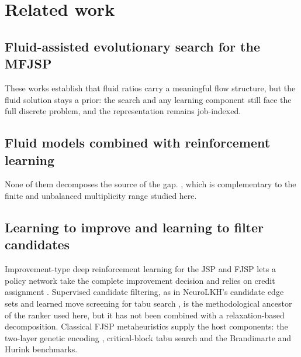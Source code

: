 \section{Related work}\label{sec:related}

\subsection{Fluid-assisted evolutionary search for the MFJSP}\label{sec:related-fluid}
 These works establish that fluid
ratios carry a meaningful flow structure, but the fluid solution stays a prior: the search and any learning component still
face the full discrete problem, and the representation remains job-indexed.

\subsection{Fluid models combined with reinforcement learning}\label{sec:related-rl}
 None of them decomposes the source of the
gap. , which is complementary to the finite and unbalanced multiplicity range
studied here.

\subsection{Learning to improve and learning to filter candidates}\label{sec:related-improve}
Improvement-type deep reinforcement learning for the JSP and FJSP lets a policy network take the complete improvement
decision and relies on credit assignment . Supervised candidate filtering, as in NeuroLKH's candidate edge sets and learned
move screening for tabu search , is the methodological ancestor of the ranker
used here, but it has not been combined with a relaxation-based decomposition. Classical FJSP metaheuristics supply the
host components: the two-layer genetic encoding \cite{pezzella2008genetic}, critical-block tabu search
\cite{mastrolilli2000effective} and the Brandimarte \cite{brandimarte1993routing} and Hurink \cite{hurink1994tabu}
benchmarks.

